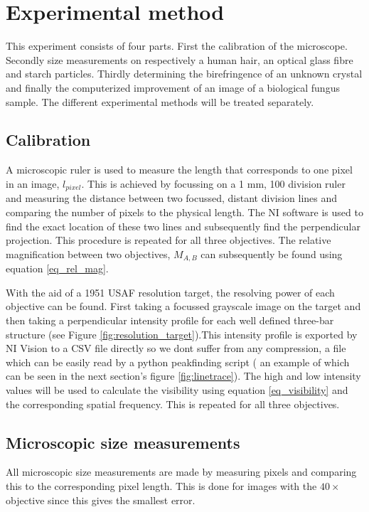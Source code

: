 \section{Experimental method}

This experiment consists of four parts. First the calibration of the microscope. Secondly size measurements on respectively a human hair, an optical glass fibre and starch particles. Thirdly determining the birefringence of an unknown crystal and finally the computerized improvement of an image of a biological fungus sample. The different experimental methods will be treated separately.

\subsection{Calibration}
\label{expmeth_calibration}
A microscopic ruler is used to measure the length that corresponds to one pixel in an image, $l_{pixel}$. This is achieved by focussing on a 1 mm, 100 division ruler and measuring the distance between two focussed, distant division lines and comparing the number of pixels to the physical length. The NI software is used to find the exact location of these two lines and subsequently find the perpendicular projection. This procedure is repeated for all three objectives. The relative magnification between two objectives, $M_{A,B}$ can subsequently be found using equation \ref{eq_rel_mag}.

\bigskip
With the aid of a 1951 USAF resolution target, the resolving power of each objective can be found. First taking a focussed grayscale image  on the target and then taking a perpendicular intensity profile for each well defined three-bar structure (see Figure \ref{fig:resolution_target}).This intensity profile is exported by NI Vision to a CSV file directly so we dont suffer from any compression, a file which can be easily read by a python peakfinding script ( an example of which can be seen in the next section's figure \ref{fig:linetrace}). The high and low intensity values will be used to calculate the visibility using equation \ref{eq_visibility} and the corresponding spatial frequency. This is repeated for all three objectives.\\

\subsection{Microscopic size measurements}

All microscopic size measurements are made by measuring pixels and comparing this to the corresponding pixel length. This is done for images with the $40\times$ objective since this gives the smallest error.

